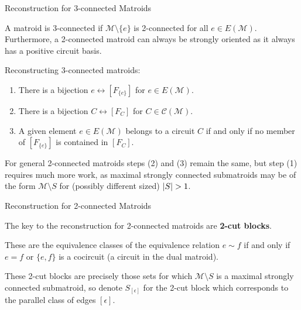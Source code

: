 \documentclass[9pt]{beamer}
\def\calM{\mathcal M}
\def\calC{\mathcal C}
\DeclarePairedDelimiter\abs{\lvert}{\rvert}
\begin{document}
    \begin{frame}{Reconstruction for 3-connected Matroids}

        A matroid is 3-connected if $\calM\setminus\{e\}$ is 2-connected for all $e\in E(\calM)$.
        Furthermore, a 2-connected matroid can always be strongly oriented as it always has a positive circuit basis.

        \vspace{12pt}

        Reconstructing 3-connected matroids:

        \pause

        \begin{enumerate}
            \item There is a bijection $e\leftrightarrow [F_{\{e\}}]$ for $e\in E(\calM)$.\pause
            \item There is a bijection $C\leftrightarrow [F_C]$ for $C\in\calC(\calM)$.\pause
            \item A given element $e\in E(\calM)$ belongs to a circuit $C$ if and only if no member of $[F_{\{e\}}]$ is contained in $[F_C]$.\pause
        \end{enumerate}

        \vspace{12pt}

        For general 2-connected matroids steps (2) and (3) remain the same, but step (1) requires much more work, as maximal strongly connected submatroids may be of the form $\calM\setminus S$ for (possibly different sized) $\abs*{S}>1$.
        
    \end{frame}

    \begin{frame}{Reconstruction for 2-connected Matroids}

        The key to the reconstruction for 2-connected matroids are \textbf{2-cut blocks}.

        \vspace{12pt}
        
        These are the equivalence classes of the equivalence relation $e\sim f$ if and only if $e=f$ or $\{e, f\}$ is a cocircuit (a circuit in the dual matroid).

        \vspace{12pt}
        
        These 2-cut blocks are precisely those sets for which $\calM\setminus S$ is a maximal strongly connected submatroid, so denote $S_{[\epsilon]}$ for the 2-cut block which corresponds to the parallel class of edges $[\epsilon]$.

    \end{frame}
\end{document}
